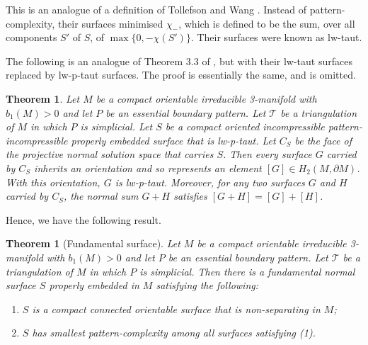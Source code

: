 \documentclass[oneside]{amsart}
\numberwithin{equation}{section}
\theoremstyle{plain}
\newtheorem{theorem}[equation]{Theorem}
\theoremstyle{definition}
\begin{document}
This is an analogue of a definition of Tollefson and Wang \cite[Section 1]{TollefsonWang}. Instead of pattern-complexity, their surfaces minimised $\chi_-$,
which is defined to be the sum, over all components $S'$ of $S$, of $\max \{ 0, -\chi(S') \}$. Their surfaces were known as lw-taut.

The following is an analogue of Theorem 3.3 of \cite{TollefsonWang}, but with their lw-taut surfaces replaced by lw-p-taut surfaces.
The proof is essentially the same, and is omitted.

\begin{theorem}
\label{Thm:TollefsonWangPattern}
Let $M$ be a compact orientable irreducible 3-manifold with $b_1(M) >0$ and let $P$ be an essential boundary pattern. 
Let $\mathcal{T}$ be a triangulation of $M$ in which $P$ is simplicial. 
Let $S$ be a compact oriented incompressible pattern-incompressible properly embedded surface that is lw-p-taut. Let $C_S$ be the face of the projective normal solution space that carries $S$.
Then every surface $G$ carried by $C_S$ inherits an orientation and so represents
an element $[G] \in H_2(M, \partial M)$. With this orientation, $G$ is lw-p-taut. Moreover, for any two
surfaces $G$ and $H$ carried by $C_S$, the normal sum $G+H$ satisfies $[G+H] = [G] + [H]$.
\end{theorem}

Hence, we have the following result.

\begin{theorem}[Fundamental surface]
\label{Thm:FundamentalTaut}
Let $M$ be a compact orientable irreducible 3-manifold with $b_1(M)>0$ and let $P$ be an essential boundary pattern. Let $\mathcal{T}$ be a triangulation of $M$ in which $P$ is simplicial. Then there is a fundamental normal surface $S$ properly embedded in $M$ satisfying the following:
\begin{enumerate}
\item $S$ is a compact connected orientable surface that is non-separating in $M$;
\item $S$ has smallest pattern-complexity among all surfaces satisfying (1).
\end{enumerate}
\end{theorem}
\end{document}
